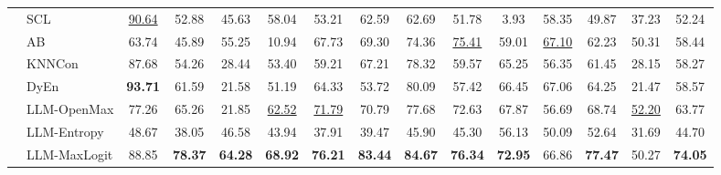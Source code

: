 \begin{tabular}{llccccccccccccc}
&SCL&\underline{90.64}&52.88&45.63&58.04&53.21&62.59&62.69&51.78&3.93&58.35&49.87&37.23&52.24\\
&AB&63.74&45.89&55.25&10.94&67.73&69.30&74.36&\underline{75.41}&59.01&\underline{67.10}&62.23&50.31&58.44\\
&KNNCon&87.68&54.26&28.44&53.40&59.21&67.21&78.32&59.57&65.25&56.35&61.45&28.15&58.27\\
&DyEn&\textbf{93.71}&61.59&21.58&51.19&64.33&53.72&80.09&57.42&66.45&67.06&64.25&21.47&58.57\\
&LLM-OpenMax&77.26&65.26&21.85&\underline{62.52}&\underline{71.79}&70.79&77.68&72.63&67.87&56.69&68.74&\underline{52.20}&63.77\\
&LLM-Entropy&48.67&38.05&46.58&43.94&37.91&39.47&45.90&45.30&56.13&50.09&52.64&31.69&44.70\\
&LLM-MaxLogit&88.85&\textbf{78.37}&\textbf{64.28}&\textbf{68.92}&\textbf{76.21}&\textbf{83.44}&\textbf{84.67}&\textbf{76.34}&\textbf{72.95}&66.86&\textbf{77.47}&50.27&\textbf{74.05}\\
\cline{1-15}
\bottomrule
\end{tabular}
